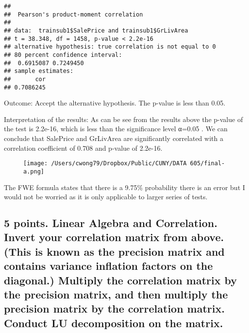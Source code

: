 \documentclass[]{article}
\newenvironment{Shaded}{\begin{snugshade}}{\end{snugshade}}
\newcommand{\KeywordTok}[1]{\textcolor[rgb]{0.13,0.29,0.53}{\textbf{#1}}}
\newcommand{\DataTypeTok}[1]{\textcolor[rgb]{0.13,0.29,0.53}{#1}}
\newcommand{\FloatTok}[1]{\textcolor[rgb]{0.00,0.00,0.81}{#1}}
\newcommand{\OperatorTok}[1]{\textcolor[rgb]{0.81,0.36,0.00}{\textbf{#1}}}
\newcommand{\NormalTok}[1]{#1}
\begin{document}
\begin{Shaded}
\end{Shaded}

\begin{verbatim}
## 
##  Pearson's product-moment correlation
## 
## data:  trainsub1$SalePrice and trainsub1$GrLivArea
## t = 38.348, df = 1458, p-value < 2.2e-16
## alternative hypothesis: true correlation is not equal to 0
## 80 percent confidence interval:
##  0.6915087 0.7249450
## sample estimates:
##       cor 
## 0.7086245
\end{verbatim}

Outcome: Accept the alternative hypothesis. The p-value is less than
0.05.

Interpretation of the results: As can be see from the results above the
p-value of the test is 2.2e-16, which is less than the significance
level α=0.05 . We can conclude that SalePrice and GrLivArea are
significantly correlated with a correlation coefficient of 0.708 and
p-value of 2.2e-16.

\begin{figure}
\centering
\texttt{[image: /Users/cwong79/Dropbox/Public/CUNY/DATA 605/final-a.png]}
\caption{}
\end{figure}

The FWE formula states that there is a 9.75\% probability there is an
error but I would not be worried as it is only applicable to larger
series of tests.

\subsection{5 points. Linear Algebra and Correlation. Invert your
correlation matrix from above. (This is known as the precision matrix
and contains variance inflation factors on the diagonal.) Multiply the
correlation matrix by the precision matrix, and then multiply the
precision matrix by the correlation matrix. Conduct LU decomposition on
the
matrix.}\label{points.-linear-algebra-and-correlation.-invert-your-correlation-matrix-from-above.-this-is-known-as-the-precision-matrix-and-contains-variance-inflation-factors-on-the-diagonal.-multiply-the-correlation-matrix-by-the-precision-matrix-and-then-multiply-the-precision-matrix-by-the-correlation-matrix.-conduct-lu-decomposition-on-the-matrix.}
\end{document}
